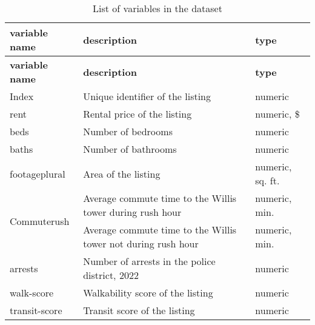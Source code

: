 \documentclass[12pt]{report}
\begin{document}
\printbibliography
\appendix
\begin{longtable}{|p{4cm}|p{8.7cm}|p{2.5cm}|} %
	\caption{List of variables in the dataset}                                                                                                     \\ \hline
	\textbf{variable name}                                & \textbf{description}                                                & \textbf{type}    \\ \hline
	\endfirsthead
	\hline
	\textbf{variable name}                                & \textbf{description}                                                & \textbf{type}    \\ \hline
	\endhead
	Index                                                 & Unique identifier of the listing                                    & numeric          \\ \hline
	rent                                                  & Rental price of the listing                                         & numeric, \$      \\ \hline
	beds                                                  & Number of bedrooms                                                  & numeric          \\ \hline
	baths                                                 & Number of bathrooms                                                 & numeric          \\ \hline
	footageplural                                         & Area of the listing                                                 & numeric, sq. ft. \\ \hline
	\multirow{2}{*}{Commute\textunderscore rush}          & Average commute time to the Willis tower during rush hour           & numeric, min.    \\ \hline
	\multirow{2}{*}{Commute\textunderscore nonrush}       & Average commute time to the Willis tower not during rush hour       & numeric, min.    \\ \hline
	arrests                                               & Number of arrests in the police district, 2022                      & numeric          \\ \hline
	walk-score                                            & Walkability score of the listing                                    & numeric          \\ \hline
	transit-score                                         & Transit score of the listing                                        & numeric          \\ \hline

\end{longtable}
\end{document}
